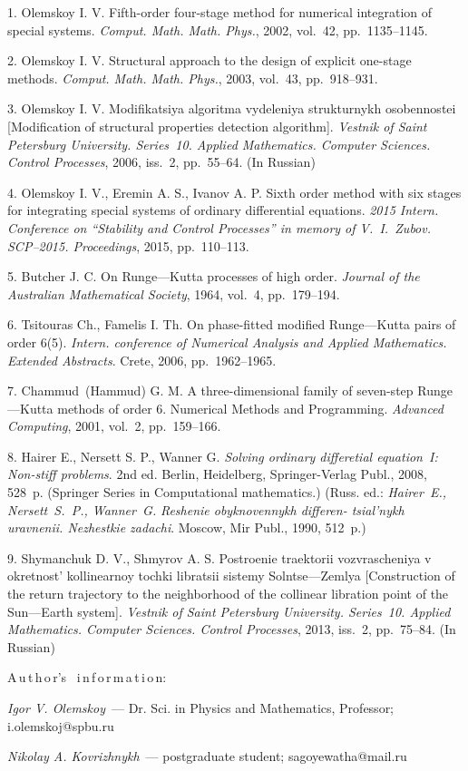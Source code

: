 {\footnotesize

1. Olemskoy I. V. Fifth-order four-stage method for numerical
integration of spe\-ci\-al sys\-tems.  {\it Comput. Math. Math.
Phys.}, 2002, vol.~42, pp.~1135--1145.

2. Olemskoy I. V. Structural approach to the design of explicit
one-stage methods. {\it Comput. Math. Math. Phys.}, 2003, vol.~43,
pp.~918--931.

3. Olemskoy I. V. Modifikatsiya algoritma vydeleniya strukturnykh
osobennostei [Modi\-fi\-ca\-tion of structural properties
detection algorithm]. {\it Vestnik of Saint Petersburg University.
Series~10. Applied Mathematics. Computer Sciences. Control
Processes}, 2006, iss.~2, pp.~55--64. (In Russian)

4. Olemskoy I. V., Eremin A. S., Ivanov A. P.  Sixth order method
with six stages for integrating special systems of ordinary
differential equations. {\it 2015 Intern. Conference on
``Stability and Control Processes'' in memory of V.~I.~Zubov.
SCP--2015. Proceedings}, 2015, pp.~110--113.

5. Butcher J. C. On Runge---Kutta processes of high order. {\it
Journal of the Australian Mathematical Society}, 1964, vol.~4,
pp.~179--194.

6. Tsitouras Ch., Famelis I. Th. On phase-fitted modified
Runge---Kutta pairs of order 6(5). {\it Intern. conference of
Numerical Analysis and Applied Mathematics. Extended Abstracts}.
Crete, 2006, pp.~1962--1965.

7. Chammud~(Hammud) G. M. A three-dimensional family of seven-step
Runge---Kutta methods of order 6. Numerical Methods and
Programming. {\it Advanced Computing}, 2001, vol.~2, pp.~159--166.

8. Hairer E., Nersett S. P., Wanner G. {\it Solving ordinary
differetial equation~I: Non-stiff problems}. 2nd ed. Berlin,
Heidelberg, Springer-Verlag Publ., 2008, 528~p. (Springer Series
in Computational mathematics.) (Russ. ed.: {\it Hairer~E.,
Nersett~S.~P., Wanner~G.} {\it Reshenie obyknovennykh differen-
tsial'nykh uravnenii. Nezhestkie zadachi}. Moscow, Mir Publ.,
1990, 512~p.)

9. Shymanchuk D. V., Shmyrov A. S. Postroenie traektorii
vozvrascheniya v okretnost' kollinearnoy tochki libratsii sistemy
Solntse---Zemlya [Construction of the return trajectory to the
neighborhood of the collinear libration point of the Sun---Earth
system]. {\it Vestnik of Saint Petersburg University. Series~10.
Applied Mathematics. Computer Sciences. Control Processes}, 2013,
iss.~2, pp.~75--84. (In Russian)

\vskip6mm A\,u\,t\,h\,o\,r's \ i\,n\,f\,o\,r\,m\,a\,t\,i\,o\,n:%

\vskip2mm \textit{Igor V. Olemskoy}~--- Dr. Sci. in Physics and
Mathematics, Professor; i.olemskoj@spbu.ru

\vskip2mm \textit{Nikolay A. Kovrizhnykh}~--- postgraduate
student; sagoyewatha@mail.ru
%
}
